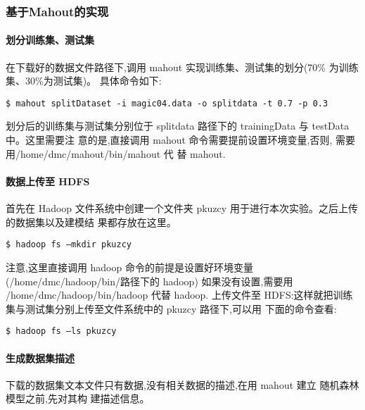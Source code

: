 \subsubsection{基于Mahout的实现}\label{ux57faux4e8emahoutux7684ux5b9eux73b0}

\paragraph{划分训练集、测试集}\label{ux5212ux5206ux8badux7ec3ux96c6ux6d4bux8bd5ux96c6}

在下载好的数据文件路径下,调用 mahout 实现训练集、测试集的划分(70\%
为训练集、30\%为测试集)。 具体命令如下:

\begin{lstlisting}
$ mahout splitDataset -i magic04.data -o splitdata -t 0.7 -p 0.3
\end{lstlisting}

划分后的训练集与测试集分别位于 splitdata 路径下的 trainingData 与
testData 中。这里需要注 意的是,直接调用 mahout
命令需要提前设置环境变量,否则, 需要用/home/dmc/mahout/bin/mahout 代 替
mahout.

\paragraph{数据上传至 HDFS}\label{ux6570ux636eux4e0aux4f20ux81f3-hdfs}

首先在 Hadoop 文件系统中创建一个文件夹 pkuzcy
用于进行本次实验。之后上传的数据集以及建模结 果都存放在这里。

\begin{lstlisting}
$ hadoop fs –mkdir pkuzcy
\end{lstlisting}

注意,这里直接调用 hadoop 命令的前提是设置好环境变量
(/home/dmc/hadoop/bin/路径下的 hadoop) 如果没有设置,需要用
/home/dmc/hadoop/bin/hadoop 代替 hadoop. 上传文件至 HDFS:这样就把训练
集与测试集分别上传至文件系统中的 pkuzcy 路径下,可以用 下面的命令查看:

\begin{lstlisting}
$ hadoop fs –ls pkuzcy
\end{lstlisting}

\paragraph{生成数据集描述}\label{ux751fux6210ux6570ux636eux96c6ux63cfux8ff0}

下载的数据集文本文件只有数据,没有相关数据的描述,在用 mahout 建立
随机森林模型之前,先对其构 建描述信息。

